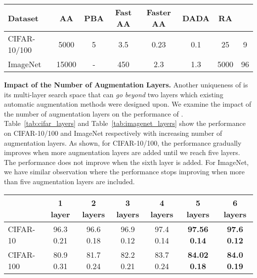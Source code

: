 \begin{table*}[!h]
\centering
\resizebox{0.8\textwidth}{!}
{
\begin{tabular}{@{}l|c|c|c|c|c|c|c@{}}
\toprule
\multicolumn{1}{l}{\textbf{Dataset}} &  
\multicolumn{1}{c}{\textbf{AA}} &
\multicolumn{1}{c}{\textbf{PBA}} &
\multicolumn{1}{c}{\textbf{Fast AA}} &
\multicolumn{1}{c}{\textbf{Faster AA}} &
\multicolumn{1}{c}{\textbf{DADA}} &
\multicolumn{1}{c}{\textbf{RA}} &
\multicolumn{1}{c}{\textbf{\DAA{}}}
\\ 
\midrule 
CIFAR-10/100 & 5000 & 5 & 3.5 & 0.23 & 0.1  & 25  & 9   \\
ImageNet & 15000 & - & 450 & 2.3 & 1.3 & 5000 & 96 \\
\bottomrule
\end{tabular}
}
\caption{{\small Policy search time on CIFAR-10/100 and ImageNet in GPU hours.}}
\label{tab:time}
\vspace{-3mm}
\end{table*}


\textbf{Impact of the Number of Augmentation Layers.} 
Another uniqueness of \DAA{} is its multi-layer search space that can \textit{go beyond} two layers which existing automatic augmentation methods were designed upon.
We examine the impact of the number of augmentation layers on the performance of \DAA{}. 
Table~\ref{tab:cifar_layers} and Table~\ref{tab:imagenet_layers} show the performance on CIFAR-10/100 and ImageNet respectively with increasing number of augmentation layers. 
As shown, for CIFAR-10/100, the performance gradually improves when  more augmentation layers are added until we reach five layers. The performance does not improve when the  sixth layer is added.
For ImageNet, we have similar observation where the performance stops improving when more than five augmentation layers are included.




\vspace{2mm}
\begin{table*}[!h]
\centering
\resizebox{0.95\textwidth}{!}
{
\begin{tabular}{@{}l|c|c|c|c|c|c@{}}
\toprule
\multicolumn{1}{l}{\textbf{}} & 
\multicolumn{1}{c}{\textbf{1 layer}} & 
\multicolumn{1}{c}{\textbf{2 layers}} &
\multicolumn{1}{c}{\textbf{3 layers}} &
\multicolumn{1}{c}{\textbf{4 layers}} &
\multicolumn{1}{c}{\textbf{5 layers}} &
\multicolumn{1}{c}{\textbf{6 layers}}
\\ 
\midrule
CIFAR-10 & 96.3  0.21 & 96.6   0.18 & 96.9  0.12 & 97.4  0.14 & \textbf{97.56}  \textbf{0.14} & \textbf{97.6}  \textbf{0.12}  \\
CIFAR-100 & 80.9  0.31  & 81.7  0.24 & 82.2  0.21 & 83.7  0.24 & \textbf{84.02}  \textbf{0.18} & \textbf{84.0}  \textbf{0.19}   \\
\bottomrule
\end{tabular}
}
\caption{{\small Top-1 test accuracy of \DAA{} on CIFAR-10/100 for different numbers of augmentation layers. The results are averaged over 4 independent runs with different initializations with the  confidence interval denoted by .}}
\label{tab:cifar_layers}
\vspace{-3mm}
\end{table*}

